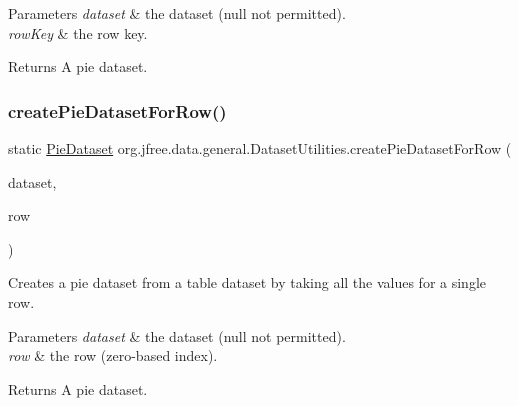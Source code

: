 \begin{DoxyParams}{Parameters}
{\em dataset} & the dataset ({\ttfamily null} not permitted). \\
\hline
{\em row\+Key} & the row key.\\
\hline
\end{DoxyParams}
\begin{DoxyReturn}{Returns}
A pie dataset. 
\end{DoxyReturn}
\mbox{\label{classorg_1_1jfree_1_1data_1_1general_1_1_dataset_utilities_a87cf3dfa610dd380c0aad6e57db00fd5}} 
\subsubsection{\texorpdfstring{create\+Pie\+Dataset\+For\+Row()}{createPieDatasetForRow()}\hspace{0.1cm}{\footnotesize\ttfamily [2/2]}}
{\footnotesize\ttfamily static \mbox{\hyperlink{interfaceorg_1_1jfree_1_1data_1_1general_1_1_pie_dataset}{Pie\+Dataset}} org.\+jfree.\+data.\+general.\+Dataset\+Utilities.\+create\+Pie\+Dataset\+For\+Row (\begin{DoxyParamCaption}\item[{\mbox{\hyperlink{interfaceorg_1_1jfree_1_1data_1_1category_1_1_category_dataset}{Category\+Dataset}}}]{dataset,  }\item[{int}]{row }\end{DoxyParamCaption})\hspace{0.3cm}{\ttfamily [static]}}

Creates a pie dataset from a table dataset by taking all the values for a single row.


\begin{DoxyParams}{Parameters}
{\em dataset} & the dataset ({\ttfamily null} not permitted). \\
\hline
{\em row} & the row (zero-\/based index).\\
\hline
\end{DoxyParams}
\begin{DoxyReturn}{Returns}
A pie dataset. 
\end{DoxyReturn}
\mbox{\label{classorg_1_1jfree_1_1data_1_1general_1_1_dataset_utilities_a3dc44edb9475e94543fbdfee43bda64c}} 
